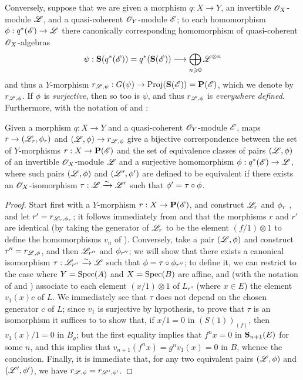 \begin{env}[4.2.2]
\label{II.4.2.2}
Conversely, suppose that we are given a morphism $q:X\to Y$, an invertible $\mathscr{O}_X$-module $\mathscr{L}$, and a quasi-coherent $\mathscr{O}_Y$-module $\mathscr{E}$;
to each homomorphism $\vphi:q^*(\sh{E})\to\sh{L}$ there canonically corresponding homomorphism of quasi-coherent $\mathscr{O}_X$-algebras
\[
  \psi: \bb{S}(q^*(\sh{E})) = q^*(\bb{S}(\sh{E})) \to \bigoplus_{n\geq0}\sh{L}^{\otimes n}
\]
and thus  a $Y$-morphism $r_{\sh{L},\psi}:G(\psi)\to\Proj(\bb{S}(\sh{E}))=\bb{P}(\sh{E})$, which we denote by $r_{\mathscr{L},\phi}$.
If $\phi$ is \emph{surjective}, then so too is $\psi$, and thus  $r_{\mathscr{L},\phi}$ is \emph{everywhere defined}.
Furthermore, with the notation of  and :
\end{env}

\begin{proposition}[4.2.3]
\label{II.4.2.3}
Given a morphism $q:X\to Y$ and a quasi-coherent $\mathscr{O}_Y$-module $\mathscr{E}$, maps $r\to(\sh{L}_r,\vphi_r)$ and $(\sh{L},\vphi)\to r_{\sh{L},\vphi}$ give a bijective correspondence between the set of $Y$-morphisms $r:X\to\bb{P}(\sh{E})$ and the set of equivalence classes of pairs $(\mathscr{L},\phi)$ of an invertible $\mathscr{O}_X$-module $\mathscr{L}$ and a surjective homomorphism $\vphi:q^*(\sh{E})\to\sh{L}$, where such pairs $(\mathscr{L},\phi)$ and $(\mathscr{L}',\phi')$ are defined to be equivalent if there exists an $\mathscr{O}_X$-isomorphism $\tau:\mathscr{L}\xrightarrow{\sim}\mathscr{L}'$ such that $\phi'=\tau\circ\phi$.
\end{proposition}

\begin{proof}
Start first with a $Y$-morphism $r:X\to\bb{P}(\sh{E})$, and construct $\mathscr{L}_r$ and $\phi_r$ , and let $r'=r_{\mathscr{L}_r,\phi_r}$;
it follows immediately from  and  that the morphisms $r$ and $r'$ are identical (by taking the generator of $\mathscr{L}_r$ to be the element $(f/1)\otimes1$ to define the homomorphisms $v_n$ of ).
Conversely, take a pair $(\mathscr{L},\phi)$ and construct
$r''=r_{\mathscr{L},\phi}$, and then $\mathscr{L}_{r''}$ and $\phi_{r''}$;
we will show that there exists a canonical isomorphism $\tau:\mathscr{L}_{r''}\xrightarrow{\sim}\mathscr{L}$ such that $\phi=\tau\circ\phi_{r''}$;
to define it, we can restrict to the case where $Y=\operatorname{Spec}(A)$ and $X=\operatorname{Spec}(B)$ are affine, and (with the notation of  and ) associate to each element $(x/1)\otimes1$ of $L_{r''}$ (where $x\in E$) the element $v_1(x)c$ of $L$.
We immediately see that $\tau$ does not depend on the chosen generator $c$ of $L$;
since $v_1$ is surjective by hypothesis, to prove that $\tau$ is an isomorphism it suffices to to show that, if $x/1=0$ in $(S(1))_{(f)}$, then $v_1(x)/1=0$ in $B_g$;
but the first equality implies that $f^nx=0$ in $\mathbf{S}_{n+1}(E)$ for some $n$, and this implies that $v_{n+1}(f^nx) = g^nv_1(x) = 0$ in $B$, whence the conclusion.
Finally, it is immediate that, for any two equivalent pairs $(\mathscr{L},\phi)$ and $(\mathscr{L}',\phi')$, we have $r_{\mathscr{L},\phi}=r_{\mathscr{L}',\phi'}$.
\end{proof}

